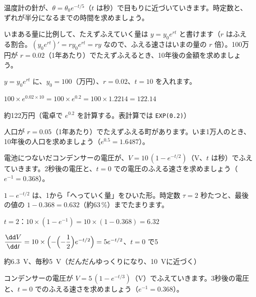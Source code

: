 \begin{jibun}
温度計の針が、$\theta=\theta_0e^{-t/5}$（$t$ は秒）で目もりに近づいていきます。時定数と、ずれが半分になるまでの時間を求めましょう。
\end{jibun}

\begin{reidai}[たえずふえる量]
いまある量に比例して、たえずふえていく量は $y=y_0e^{rt}$ と書けます（$r$ はふえる割合。$(y_0e^{rt})'=ry_0e^{rt}=ry$ なので、ふえる速さはいまの量の $r$ 倍）。100万円が $r=0.02$（1年あたり）でたえずふえるとき、10年後の金額を求めましょう。\par
\kangaekata $y=y_0e^{rt}$ に、$y_0=100$（万円）、$r=0.02$、$t=10$ を入れます。\par
\shiki $100\times e^{0.02\times10}=100\times e^{0.2}=100\times1.2214=122.14$\par
\kotae 約122万円（電卓で $e^{0.2}$ を計算する。表計算では \texttt{EXP(0.2)}）
\end{reidai}

\begin{jibun}
人口が $r=0.05$（1年あたり）でたえずふえる町があります。いま1万人のとき、10年後の人口を求めましょう（$e^{0.5}=1.6487$）。
\end{jibun}

\begin{reidai}[コンデンサーにたまる電圧]
電池につないだコンデンサーの電圧が、$V=10\,(1-e^{-t/2})$（V、$t$ は秒）でふえていきます。2秒後の電圧と、$t=0$ での電圧のふえる速さを求めましょう（$e^{-1}=0.368$）。\par
\kangaekata $1-e^{-t/2}$ は、1から「へっていく量」をひいた形。時定数 $\tau=2$ 秒たつと、最後の値の $1-0.368=0.632$（約63\,\%）までたまります。\par
\shiki $t=2$：$10\times(1-e^{-1})=10\times(1-0.368)=6.32$\par
\hspace*{2.6\zw}$\dfrac{\dd V}{\dd t}=10\times\Bigl(-\Bigl(-\dfrac{1}{2}\Bigr)e^{-t/2}\Bigr)=5e^{-t/2}$、$t=0$ で5\par
\kotae 約\qty{6.3}{V}、毎秒\qty{5}{V}（だんだんゆっくりになり、\qty{10}{V}に近づく）
\end{reidai}

\begin{jibun}
コンデンサーの電圧が $V=5\,(1-e^{-t/3})$（V）でふえていきます。3秒後の電圧と、$t=0$ でのふえる速さを求めましょう（$e^{-1}=0.368$）。
\end{jibun}

